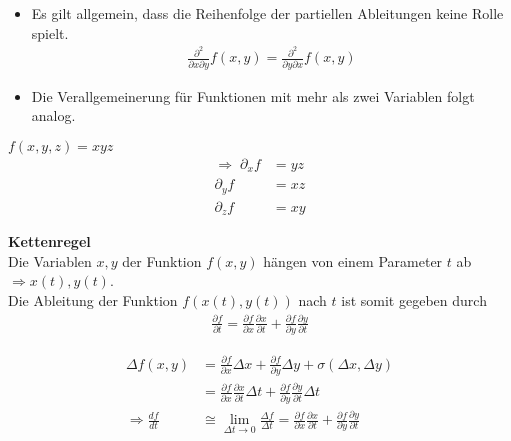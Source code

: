 \begin{Bemerkung}
\par\par
\begin{itemize}
\item Es gilt allgemein, dass die Reihenfolge der partiellen Ableitungen
  keine Rolle spielt.
  \begin{align}
\frac{\partial^2}{\partial x\partial y} f(x,y) = \frac{\partial^2}{\partial y \partial x} f(x,y)
\end{align}
\item Die Verallgemeinerung für Funktionen mit mehr als zwei Variablen folgt
analog.
\end{itemize}
\end{Bemerkung}

\begin{Beispiel} $f(x,y,z) = xyz$
\begin{align*}
\Rightarrow\;\partial_x f &= yz\\
\partial_y f &= xz\\
\partial_z f &= xy
\end{align*}
\end{Beispiel}


\par{\bf Kettenregel}\\
Die Variablen $x,y$ der Funktion $f(x,y)$ hängen von
einem Parameter $t$ ab $\Rightarrow x(t), y(t)$.\\ Die Ableitung der Funktion $f(x(t), y(t))$ nach $t$ ist somit gegeben durch
\begin{align}
\frac{\partial f}{\partial t} = \frac{\partial f}{\partial x}\frac{\partial x}{\partial t} + \frac{\partial f}{\partial y}\frac{\partial y}{\partial t}
\end{align}
\begin{info}
\begin{align*}
\Delta f(x,y) & = \frac{\partial f}{\partial x}\Delta x + \frac{\partial
f}{\partial y}\Delta y +\sigma(\Delta x, \Delta y)\\ &=  \frac{\partial
f}{\partial x}
\frac{\partial x}{\partial t}\Delta t +  \frac{\partial f}{\partial y}
\frac{\partial y}{\partial t}\Delta t\\ \Rightarrow \frac{df}{dt} & \cong \lim \limits_{\Delta t \to 0} \frac{\Delta f}{\Delta t} =  \frac{\partial f}{\partial x} \frac{\partial x}{\partial t} +  \frac{\partial f}{\partial y} \frac{\partial y}{\partial t}
\end{align*}
\end{info}

